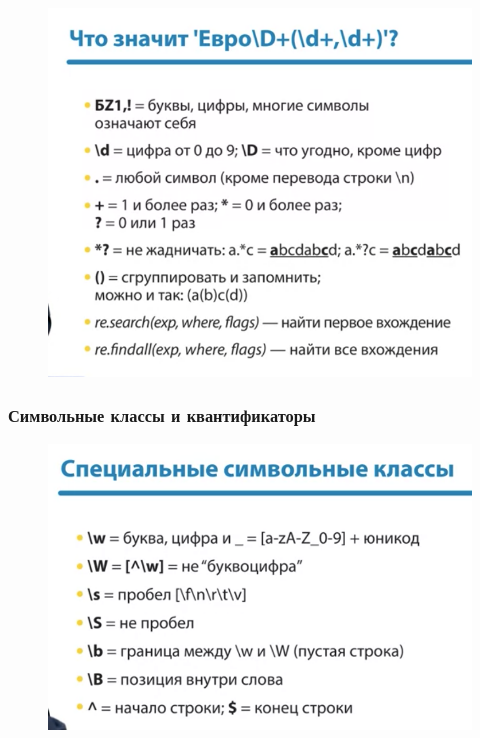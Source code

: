 \documentclass[a4paper,12pt]{article}
\begin{document}
	\begin{figure}[h!]
		\begin{center}
			{\includegraphics[scale = 1]{15.png}}
			\label{15}
		\end{center}
	\end{figure}
	
	\subsubsection{Символьные классы и квантификаторы}
	
	\begin{figure}[h!]
		\begin{center}
			{\includegraphics[scale = 1]{16.png}}
			\label{16}
		\end{center}
	\end{figure}
\end{document}
